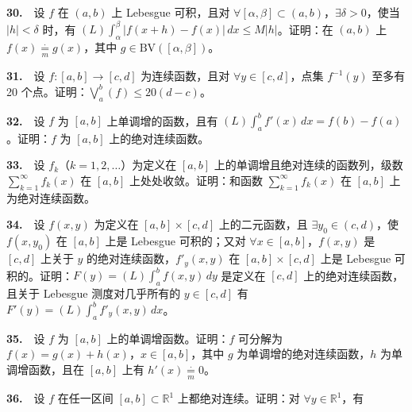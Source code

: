 \documentclass[11pt,a4paper]{article}
\begin{document}
\par{}\hypertarget{review30}{}\noindent \textbf{30.}　设 \(f\) 在 \((a,b)\) 上 Lebesgue 可积，且对 \(\forall[\alpha,\beta]\subset(a,b)\)，\(\exists\delta>0\)，使当 \(|h|<\delta\) 时，有 \((L)\int_\alpha^\beta|f(x+h)-f(x)|\,dx\le M|h|\)。证明：在 \((a,b)\) 上 \(f(x)\underset{m}{\overset{\cdot}{=}} g(x)\)，其中 \(g\in\mathrm{BV}([\alpha,\beta])\)。

\par{}\hypertarget{review31}{}\noindent \textbf{31.}　设 \(f:[a,b]\to[c,d]\) 为连续函数，且对 \(\forall y\in[c,d]\)，点集 \(f^{-1}(y)\) 至多有 20 个点。证明：\(\bigvee_a^b(f)\le20(d-c)\)。

\par{}\hypertarget{review32}{}\noindent \textbf{32.}　设 \(f\) 为 \([a,b]\) 上单调增的函数，且有 \((L)\int_a^b f'(x)\,dx=f(b)-f(a)\)。证明：\(f\) 为 \([a,b]\) 上的绝对连续函数。

\par{}\hypertarget{review33}{}\noindent \textbf{33.}　设 \(f_k\)（\(k=1,2,\ldots\)）为定义在 \([a,b]\) 上的单调增且绝对连续的函数列，级数 \(\sum_{k=1}^\infty f_k(x)\) 在 \([a,b]\) 上处处收敛。证明：和函数 \(\sum_{k=1}^\infty f_k(x)\) 在 \([a,b]\) 上为绝对连续函数。

\par{}\hypertarget{review34}{}\noindent \textbf{34.}　设 \(f(x,y)\) 为定义在 \([a,b]\times[c,d]\) 上的二元函数，且 \(\exists y_0\in(c,d)\)，使 \(f(x,y_0)\) 在 \([a,b]\) 上是 Lebesgue 可积的；又对 \(\forall x\in[a,b]\)，\(f(x,y)\) 是 \([c,d]\) 上关于 \(y\) 的绝对连续函数，\(f'_y(x,y)\) 在 \([a,b]\times[c,d]\) 上是 Lebesgue 可积的。证明：\(F(y)=(L)\int_a^b f(x,y)\,dy\) 是定义在 \([c,d]\) 上的绝对连续函数，且关于 Lebesgue 测度对几乎所有的 \(y\in[c,d]\) 有 \(F'(y)=(L)\int_a^b f'_y(x,y)\,dx\)。

\par{}\hypertarget{review35}{}\noindent \textbf{35.}　设 \(f\) 为 \([a,b]\) 上的单调增函数。证明：\(f\) 可分解为 \(f(x)=g(x)+h(x)\)，\(x\in[a,b]\)，其中 \(g\) 为单调增的绝对连续函数，\(h\) 为单调增函数，且在 \([a,b]\) 上有 \(h'(x)\underset{m}{\overset{\cdot}{=}}0\)。

\par{}\hypertarget{review36}{}\noindent \textbf{36.}　设 \(f\) 在任一区间 \([a,b]\subset\mathbb R^1\) 上都绝对连续。证明：对 \(\forall y\in\mathbb R^1\)，有
\end{document}
